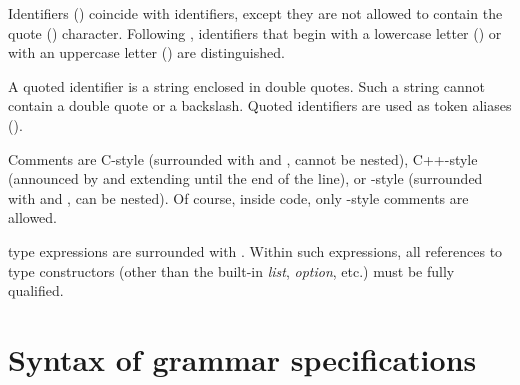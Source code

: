 \documentclass[onecolumn,11pt,nocopyrightspace,preprint]{sigplanconf}
\begin{document}
Identifiers () coincide with \ocaml identifiers, except they are not
allowed to contain the quote () character. Following
\ocaml, identifiers that begin with a lowercase letter
() or with an uppercase letter () are distinguished.

A quoted identifier  is a string enclosed in double quotes.
Such a string cannot contain a double quote or a backslash.
Quoted identifiers are used as token aliases ().

Comments are C-style (surrounded with \kw{/*} and \kw{*/}, cannot be nested),
C++-style (announced by \kw{/$\!$/} and extending until the end of the line), or
\ocaml-style (surrounded with \kw{(*} and \kw{*)}, can be nested). Of course,
inside \ocaml code, only \ocaml-style comments are allowed.

\ocaml type expressions are surrounded with . Within such expressions,
all references to type constructors (other than the built-in \textit{list}, \textit{option}, etc.)
must be fully qualified.


\section{Syntax of grammar specifications}

\newcommand{\modifier}{(\,\dquestion \metachoice \dplus \metachoice \dstar\kern-.3mm)}
\end{document}
